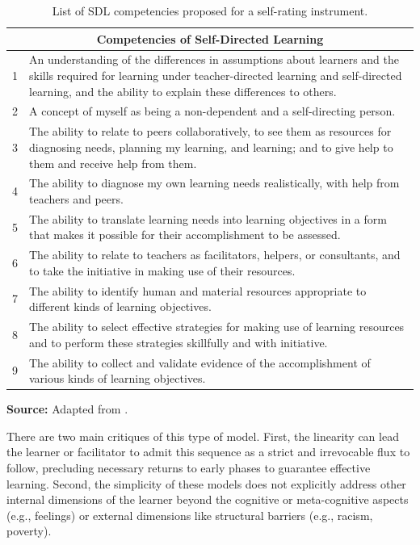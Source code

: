 \begin{table}[ht]
\caption{List of \acrshort{SDL} competencies proposed for a self-rating instrument.}
\label{tbl:sdl-competencies}
\centering
{}
\begin{tabular}{p{0.5cm}p{14.5cm}}
\hline
\multicolumn{2}{c}{\textbf{Competencies of Self-Directed Learning}} \\
\hline     
1 &
An understanding of the differences in assumptions about learners and the skills required for learning under teacher-directed learning and self-directed learning, and the ability to explain these differences to others.\\
2 &
A concept of myself as being a non-dependent and a self-directing person.\\
3 &
The ability to relate to peers collaboratively, to see them as resources for diagnosing needs, planning my learning, and learning; and to give help to them and receive help from them.\\
4 &
The ability to diagnose my own learning needs realistically, with help from teachers and peers.\\
5 &
The ability to translate learning needs into learning objectives in a form that makes it possible for their accomplishment to be assessed.\\
6 &
The ability to relate to teachers as facilitators, helpers, or consultants, and to take the initiative in making use of their resources.\\
7 &
The ability to identify human and material resources appropriate to different kinds of learning objectives.\\
8 &
The ability to select effective strategies for making use of learning resources and to perform these strategies skillfully and with initiative.\\
9 &
The ability to collect and validate evidence of the accomplishment of various kinds of learning objectives.\\
\hline

\end{tabular}

  \par\medskip\ABNTEXfontereduzida\selectfont\textbf{Source:} Adapted from \cite[p.~61]{knowles:1975}. \par\medskip
\end{table}

There are two main critiques of this type of model. First, the linearity can lead the learner or facilitator to admit this sequence as a strict and irrevocable flux to follow, precluding necessary returns to early phases to guarantee effective learning. Second, the simplicity of these models does not explicitly address other internal dimensions of the learner beyond the cognitive or meta-cognitive aspects (e.g., feelings) or external dimensions like structural barriers (e.g., racism, poverty). 

